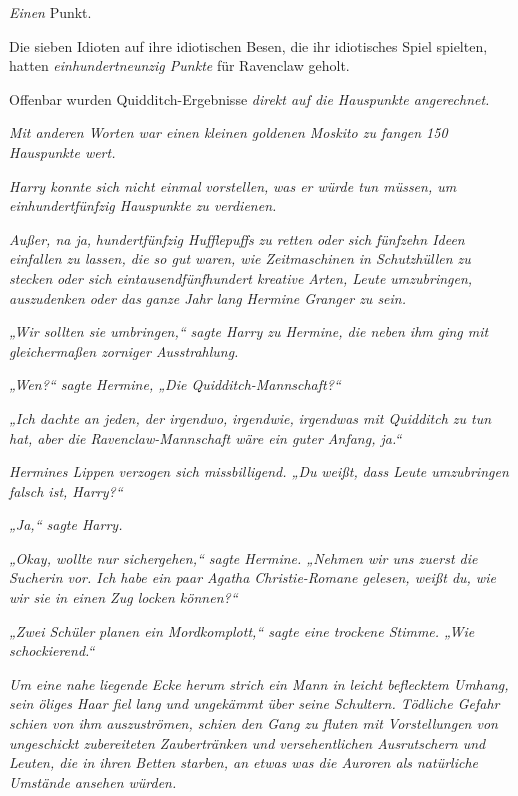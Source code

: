 {\emph{Einen} Punkt.

Die sieben Idioten auf ihre idiotischen Besen, die ihr idiotisches Spiel spielten, hatten \emph{einhundertneunzig Punkte} für Ravenclaw geholt.

Offenbar wurden Quidditch-Ergebnisse \emph{direkt auf die Hauspunkte angerechnet.}

\emph{Mit anderen Worten war einen kleinen goldenen Moskito zu fangen 150 Hauspunkte wert.}

\emph{Harry konnte sich nicht einmal} \emph{\emph{vorstellen,}} \emph{was er würde tun müssen, um einhundertfünfzig Hauspunkte zu verdienen.}

\emph{Außer, na ja,} \emph{\emph{hundertfünfzig Hufflepuffs}} \emph{zu retten oder} \emph{sich} \emph{\emph{fünfzehn Ideen einfallen zu lassen, die so gut waren, wie Zeitmaschinen in Schutzhüllen zu stecken}} \emph{oder sich} \emph{\emph{eintausendfünfhundert kreative Arten, Leute umzubringen}, auszudenken oder das} \emph{\emph{ganze Jahr lang}} \emph{Hermine Granger zu sein.}

\emph{„Wir sollten sie umbringen,“ sagte Harry zu Hermine, die neben ihm ging mit gleichermaßen zorniger Ausstrahlung.}

\emph{„Wen?“ sagte Hermine, „Die Quidditch-Mannschaft?“}

\emph{„Ich dachte an jeden, der irgendwo,} \emph{irgendwie,} \emph{irgendwas mit Quidditch zu tun hat, aber die Ravenclaw-Mannschaft wäre ein guter Anfang, ja.“}

\emph{Hermines Lippen verzogen sich missbilligend. „Du} \emph{\emph{weißt,}} \emph{dass Leute umzubringen falsch ist, Harry?“}

\emph{„Ja,“ sagte Harry.}

\emph{„Okay, wollte nur sichergehen,“ sagte Hermine. „Nehmen wir uns zuerst die Sucherin vor. Ich habe ein paar Agatha Christie-Romane gelesen, weißt du, wie wir sie in einen Zug locken können?“}

\emph{„Zwei Schüler} \emph{planen ein Mordkomplott,“ sagte eine trockene Stimme. „Wie schockierend.“}

\emph{Um eine nahe} \emph{liegende} \emph{Ecke herum strich ein Mann in leicht beflecktem Umhang, sein öliges Haar fiel lang und ungekämmt über seine Schultern. Tödliche Gefahr schien von ihm auszuströmen, schien den Gang zu fluten mit Vorstellungen von ungeschickt zubereiteten Zaubertränken und versehentlichen Ausrutschern und Leuten, die in ihren Betten starben, an etwas was die Auroren als natürliche Umstände ansehen würden.}

}
